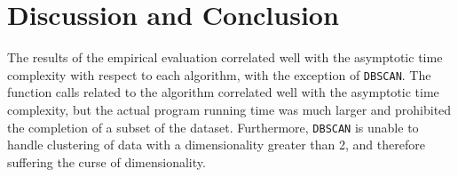 \documentclass[conference, 10pt]{IEEEtran}
\begin{document}
\begin{center}
\end{center}


\section{Discussion and Conclusion}
The results of the empirical evaluation correlated well with the asymptotic time complexity with respect to each algorithm, with the exception of \texttt{DBSCAN}. The function calls related to the algorithm correlated well with the asymptotic time complexity, but the actual program running time was much larger and prohibited the completion of a subset of the dataset. Furthermore, \texttt{DBSCAN} is unable to handle clustering of data with a dimensionality greater than 2, and therefore suffering the curse of dimensionality. \cite{optimal}
\end{document}
